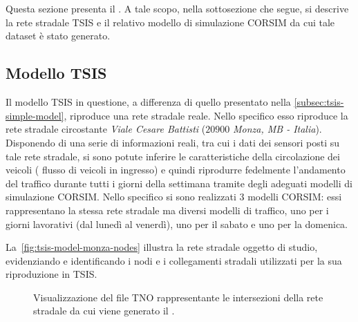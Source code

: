 \cleardoublepage
\section{}\label{sec:dataset-2}
Questa sezione presenta il . A tale scopo, nella sottosezione che segue, si descrive la rete stradale \acs{TSIS} e il relativo modello di simulazione \acs{CORSIM} da cui tale dataset è stato generato.

\subsection{Modello TSIS}\label{subsec:tsis-monza-model}
Il modello \acs{TSIS} in questione, a differenza di quello presentato nella \autoref{subsec:tsis-simple-model}, riproduce una rete stradale reale. Nello specifico esso riproduce la rete stradale circostante \emph{Viale Cesare Battisti} ($20900$ \emph{Monza, MB - Italia}). Disponendo di una serie di informazioni reali, tra cui i dati dei sensori posti su tale rete stradale, si sono potute inferire le caratteristiche della circolazione dei veicoli (\eg{} flusso di veicoli in ingresso) e quindi riprodurre fedelmente l'andamento del traffico durante tutti i giorni della settimana tramite degli adeguati modelli di simulazione \acs{CORSIM}. Nello specifico si sono realizzati $3$ modelli \acs{CORSIM}: essi rappresentano la stessa rete stradale ma diversi modelli di traffico, uno per i giorni lavorativi (dal lunedì al venerdì), uno per il sabato e uno per la domenica.

La~\vref{fig:tsis-model-monza-nodes} illustra la rete stradale oggetto di studio, evidenziando e identificando i nodi e i collegamenti stradali utilizzati per la sua riproduzione in \acs{TSIS}.
\begin{figure}
  \centering
  \captionsetup[subfigure]{labelformat=empty}
  \label{fig:tsis-model-monza-nodes}
\end{figure}
\begin{figure}[ht]
  \centering
  \captionsetup{type=figure}
  \captionsetup[subfigure]{labelformat=empty}
  \caption[Intersezioni della rete stradale del ]{Visualizzazione del file \acs{TNO} rappresentante le intersezioni della rete stradale da cui viene generato il .}
\end{figure}

